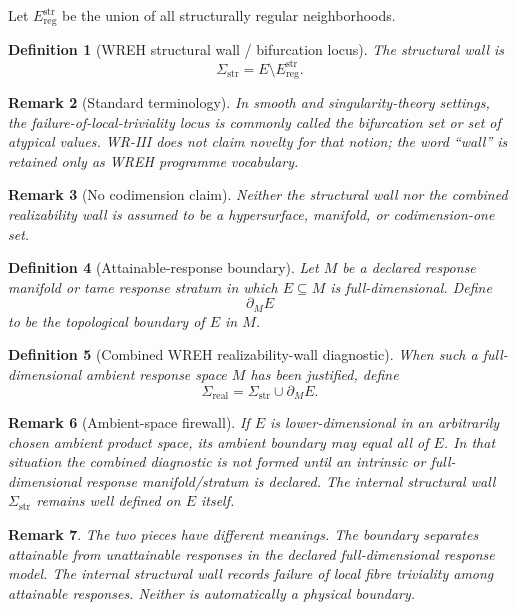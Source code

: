 \documentclass[11pt]{article}
\newtheorem{definition}{Definition}[section]
\newtheorem{remark}[definition]{Remark}
\begin{document}
Let \(E_{\mathrm{reg}}^{\mathrm{str}}\) be the union of all structurally regular
neighborhoods.

\begin{definition}[WREH structural wall / bifurcation locus]
The structural wall is
\[
\Sigma_{\mathrm{str}}
=
E\setminus E_{\mathrm{reg}}^{\mathrm{str}}.
\]
\end{definition}

\begin{remark}[Standard terminology]
In smooth and singularity-theory settings, the failure-of-local-triviality
locus is commonly called the bifurcation set or set of atypical values.
WR-III does not claim novelty for that notion; the word ``wall'' is retained
only as WREH programme vocabulary.
\end{remark}

\begin{remark}[No codimension claim]
Neither the structural wall nor the combined realizability wall is assumed to
be a hypersurface, manifold, or codimension-one set.
\end{remark}
\begin{definition}[Attainable-response boundary]
Let \(M\) be a declared response manifold or tame response stratum in which
\(E\subseteq M\) is full-dimensional. Define
\[
\partial_M E
\]
to be the topological boundary of \(E\) in \(M\).
\end{definition}

\begin{definition}[Combined WREH realizability-wall diagnostic]
When such a full-dimensional ambient response space \(M\) has been justified,
define
\[
\Sigma_{\mathrm{real}}
=
\Sigma_{\mathrm{str}}\cup\partial_M E.
\]
\end{definition}

\begin{remark}[Ambient-space firewall]
If \(E\) is lower-dimensional in an arbitrarily chosen ambient product space,
its ambient boundary may equal all of \(E\). In that situation the combined
diagnostic is not formed until an intrinsic or full-dimensional response
manifold/stratum is declared. The internal structural wall
\(\Sigma_{\mathrm{str}}\) remains well defined on \(E\) itself.
\end{remark}

\begin{remark}
The two pieces have different meanings. The boundary separates attainable
from unattainable responses in the declared full-dimensional response model.
The internal structural wall records failure of local fibre triviality among
attainable responses. Neither is automatically a physical boundary.
\end{remark}
\end{document}
